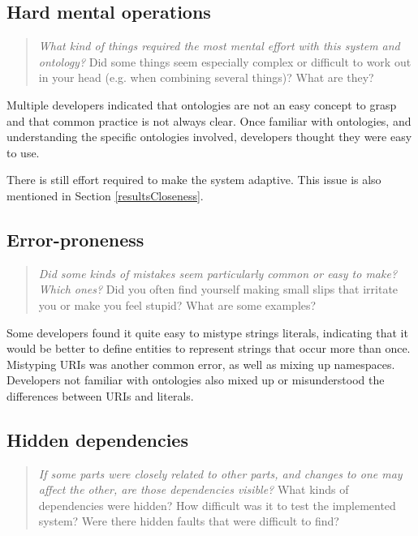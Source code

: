 \subsection{Hard mental operations}

\begin{quote}
	\emph{What kind of things required the most mental effort with this system and ontology?}
	Did some things seem especially complex or difficult to work out in your head (e.g. when combining several things)? What are they?
\end{quote}

Multiple developers indicated that ontologies are not an easy concept to grasp and that common practice is not always clear. Once familiar with ontologies, and understanding the specific ontologies involved, developers thought they were easy to use.  

There is still effort required to make the system adaptive. This issue is also mentioned in Section \ref{resultsCloseness}.


\subsection{Error-proneness}

\begin{quote}
	\emph{Did some kinds of mistakes seem particularly common or easy to make? Which ones?}
	Did you often find yourself making small slips that irritate you or make you feel stupid? What are some examples?
\end{quote}

Some developers found it quite easy to mistype strings literals, indicating that it would be better to define entities to represent strings that occur more than once. Mistyping URIs was another common error, as well as mixing up namespaces. Developers not familiar with ontologies also mixed up or misunderstood the differences between URIs and literals.

\subsection{Hidden dependencies}

\begin{quote}
	\emph{If some parts were closely related to other parts, and changes to one may affect the other, are those dependencies visible?}
	What kinds of dependencies were hidden? How difficult was it to test the implemented system? Were there hidden faults that were difficult to find?
\end{quote}

